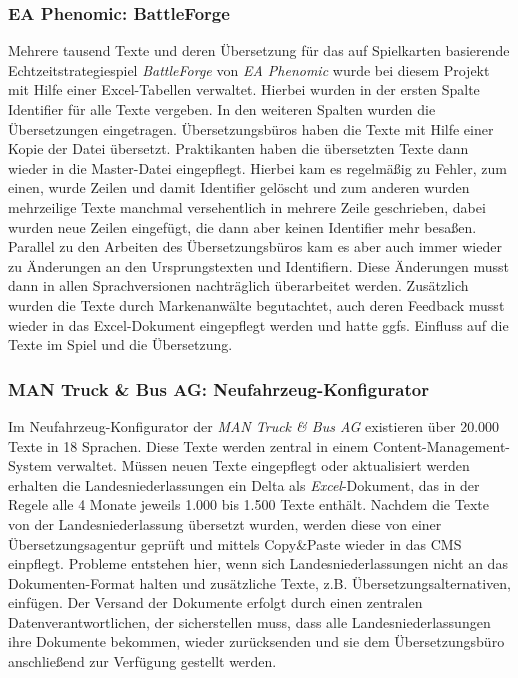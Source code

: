 \subsubsection{EA Phenomic: BattleForge}

Mehrere tausend Texte und deren Übersetzung für das auf Spielkarten basierende Echtzeitstrategiespiel \emph{BattleForge} von \emph{EA Phenomic} wurde bei diesem Projekt mit Hilfe einer Excel-Tabellen verwaltet. Hierbei wurden in der ersten Spalte Identifier für alle Texte vergeben. In den weiteren Spalten wurden die Übersetzungen eingetragen. Übersetzungsbüros haben die Texte mit Hilfe einer Kopie der Datei übersetzt. Praktikanten haben die übersetzten Texte dann wieder in die Master-Datei eingepflegt. Hierbei kam es regelmäßig zu Fehler, zum einen, wurde Zeilen und damit Identifier gelöscht und zum anderen wurden mehrzeilige Texte manchmal versehentlich in mehrere Zeile geschrieben, dabei wurden neue Zeilen eingefügt, die dann aber keinen Identifier mehr besaßen. Parallel zu den Arbeiten des Übersetzungsbüros kam es aber auch immer wieder zu Änderungen an den Ursprungstexten und Identifiern. Diese Änderungen musst dann in allen Sprachversionen nachträglich überarbeitet werden. Zusätzlich wurden die Texte durch Markenanwälte begutachtet, auch deren Feedback musst wieder in das Excel-Dokument eingepflegt werden und hatte ggfs. Einfluss auf die Texte im Spiel und die Übersetzung.

\subsubsection{MAN Truck \& Bus AG: Neufahrzeug-Konfigurator}

Im Neufahrzeug-Konfigurator der \emph{MAN Truck \& Bus AG} existieren über 20.000 Texte in 18 Sprachen. Diese Texte werden zentral in einem Content-Management-System verwaltet. Müssen neuen Texte eingepflegt oder aktualisiert werden erhalten die Landesniederlassungen ein Delta als \emph{Excel}-Dokument, das in der Regele alle 4 Monate jeweils 1.000 bis 1.500 Texte enthält. Nachdem die Texte von der Landesniederlassung übersetzt wurden, werden diese von einer Übersetzungsagentur geprüft und mittels Copy\&Paste wieder in das CMS einpflegt.  Probleme entstehen hier, wenn sich Landesniederlassungen nicht an das Dokumenten-Format halten und zusätzliche Texte, z.B. Übersetzungsalternativen, einfügen. Der Versand der Dokumente erfolgt durch einen zentralen Datenverantwortlichen, der sicherstellen muss, dass alle Landesniederlassungen ihre Dokumente bekommen, wieder zurücksenden und sie dem Übersetzungsbüro anschließend zur Verfügung gestellt werden.

